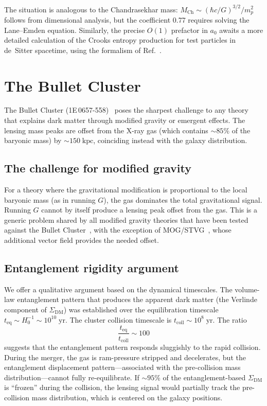 \documentclass[prd,twocolumn,superscriptaddress,longbibliography,floatfix]{revtex4-2}
\begin{document}
The situation is analogous to the Chandrasekhar mass:
$M_{\mathrm{Ch}} \sim (\hbar c/G)^{3/2}/m_p^2$ follows from
dimensional analysis, but the coefficient 0.77 requires
solving the Lane--Emden equation.  Similarly, the precise
$O(1)$ prefactor in $a_0$ awaits a more detailed calculation
of the Crooks entropy production for test particles in
de~Sitter spacetime, using the formalism of
Ref.~\cite{BassoCeleri2025}.

\section{The Bullet Cluster}
\label{sec:bullet}

The Bullet Cluster (1E\,0657-558)~\cite{Clowe2006} poses the
sharpest challenge to any theory that explains dark matter
through modified gravity or emergent effects.  The lensing
mass peaks are offset from the X-ray gas (which contains
$\sim\!85\%$ of the baryonic mass) by $\sim\!150\;\mathrm{kpc}$,
coinciding instead with the galaxy distribution.

\subsection{The challenge for modified gravity}

For a theory where the gravitational modification is
proportional to the local baryonic mass (as in running $G$),
the gas dominates the total gravitational signal.  Running $G$
cannot by itself produce a lensing peak offset from the gas.
This is a generic problem shared by all modified gravity
theories that have been tested against the Bullet
Cluster~\cite{Famaey2012}, with the exception of
MOG/STVG~\cite{Brownstein2007}, whose additional vector field
provides the needed offset.

\subsection{Entanglement rigidity argument}

We offer a qualitative argument based on the dynamical
timescales.  The volume-law entanglement pattern that
produces the apparent dark matter (the Verlinde component of
$\Sigma_{\mathrm{DM}}$) was established over the equilibration
timescale
$t_{\mathrm{eq}} \sim H_0^{-1} \sim 10^{10}\;\mathrm{yr}$.
The cluster collision timescale is
$t_{\mathrm{coll}} \sim 10^{8}\;\mathrm{yr}$.  The ratio
\begin{equation}
\frac{t_{\mathrm{eq}}}{t_{\mathrm{coll}}} \sim 100
\label{eq:timescale}
\end{equation}
suggests that the entanglement pattern responds sluggishly
to the rapid collision.  During the merger, the gas is
ram-pressure stripped and decelerates, but the entanglement
displacement pattern---associated with the pre-collision mass
distribution---cannot fully re-equilibrate.  If $\sim\!95\%$ of
the entanglement-based $\Sigma_{\mathrm{DM}}$ is ``frozen''
during the collision, the lensing signal would partially track
the pre-collision mass distribution, which is centered on the
galaxy positions.
\end{document}
